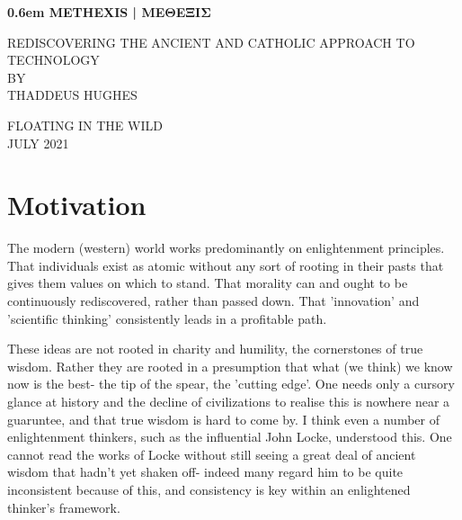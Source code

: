 \documentclass[letterpaper]{article}
\begin{document}
\clearpage
\newcommand\nbvspace[1][3]{\vspace*{\stretch{#1}}}
\newcommand\nbstretchyspace{\spaceskip0.5em plus 0.25em minus 0.25em}
\newcommand{\nbtitlestretch}{\spaceskip0.6em}
\pagestyle{plain}
\begin{center}
  \bfseries
  \nbvspace[1]
  \Huge
  {\nbtitlestretch\huge
    METHEXIS | ΜΕΘΕΞΙΣ}

  \nbvspace[1]
  \normalsize
  REDISCOVERING THE ANCIENT AND CATHOLIC APPROACH TO TECHNOLOGY\\

  \nbvspace[1]
  \small BY\\
  \Large THADDEUS HUGHES\\

  \nbvspace[2]

  \nbvspace[3]
  \normalsize

  \large
  FLOATING IN THE WILD \\
  \small JULY 2021 \\
\end{center}

\raggedbottom


\section{Motivation}

The modern (western) world works predominantly on enlightenment principles. That individuals exist as atomic without any sort of rooting in their pasts that gives them values on which to stand. That morality can and ought to be continuously rediscovered, rather than passed down. That 'innovation' and 'scientific thinking' consistently leads in a profitable path.

These ideas are not rooted in charity and humility, the cornerstones of true wisdom. Rather they are rooted in a presumption that what (we think) we know now is the best- the tip of the spear, the 'cutting edge'. One needs only a cursory glance at history and the decline of civilizations to realise this is nowhere near a guaruntee, and that true wisdom is hard to come by. I think even a number of enlightenment thinkers, such as the influential John Locke, understood this. One cannot read the works of Locke without still seeing a great deal of ancient wisdom that hadn't yet shaken off- indeed many regard him to be quite inconsistent because of this, and consistency is key within an enlightened thinker's framework.
\end{document}
